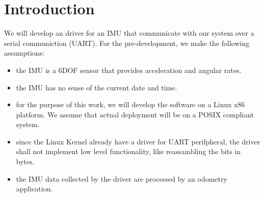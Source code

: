 \section{Introduction}
We will develop an driver for an IMU that communicate with our system over a serial communiction (UART).
For the pre-development, we make the following assumptions:
\begin{itemize}
    \item the IMU is a 6DOF sensor that provides acceleration and angular rates.
    \item the IMU has no sense of the current date and time.
    \item for the purpose of this work, we will develop the software on a Linux x86 platform. We assume that actual deployment will be on a POSIX compliant system.
    \item since the Linux Kernel already have a driver for UART perifpheral, the driver shall not implement low level functionality, like reassambling the bits in bytes.
    \item the IMU data collected by the driver are processed by an odometry application.
\end{itemize}
